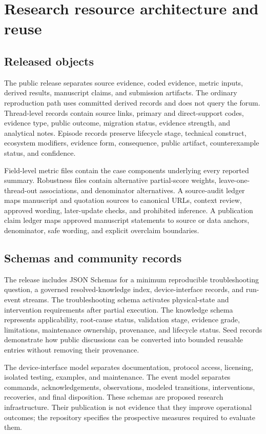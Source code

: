 \section{Research resource architecture and reuse}
\label{sec:resource}

\subsection{Released objects}

The public release separates source evidence, coded evidence, metric inputs, derived results, manuscript claims, and submission artifacts. The ordinary reproduction path uses committed derived records and does not query the forum. Thread-level records contain source links, primary and direct-support codes, evidence type, public outcome, migration status, evidence strength, and analytical notes. Episode records preserve lifecycle stage, technical construct, ecosystem modifiers, evidence form, consequence, public artifact, counterexample status, and confidence.

Field-level metric files contain the case components underlying every reported summary. Robustness files contain alternative partial-score weights, leave-one-thread-out associations, and denominator alternatives. A source-audit ledger maps manuscript and quotation sources to canonical URLs, context review, approved wording, later-update checks, and prohibited inference. A publication claim ledger maps approved manuscript statements to source or data anchors, denominator, safe wording, and explicit overclaim boundaries.

\subsection{Schemas and community records}

The release includes JSON Schemas for a minimum reproducible troubleshooting question, a governed resolved-knowledge index, device-interface records, and run-event streams. The troubleshooting schema activates physical-state and intervention requirements after partial execution. The knowledge schema represents applicability, root-cause status, validation stage, evidence grade, limitations, maintenance ownership, provenance, and lifecycle status. Seed records demonstrate how public discussions can be converted into bounded reusable entries without removing their provenance.

The device-interface model separates documentation, protocol access, licensing, isolated testing, examples, and maintenance. The event model separates commands, acknowledgements, observations, modeled transitions, interventions, recoveries, and final disposition. These schemas are proposed research infrastructure. Their publication is not evidence that they improve operational outcomes; the repository specifies the prospective measures required to evaluate them.

